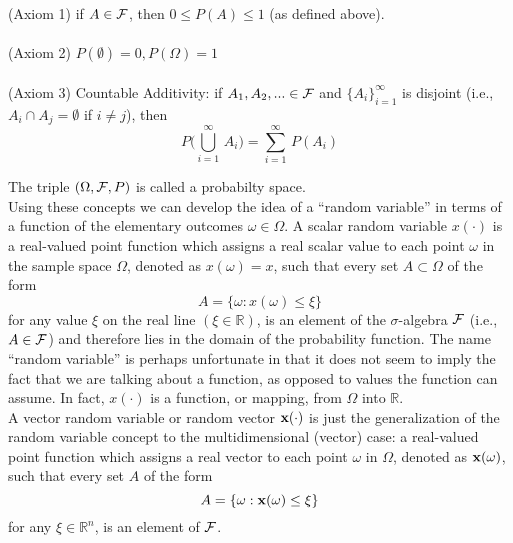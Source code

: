 (Axiom 1) if $A \in {\cal F}$, then $0\le P(A) \le 1$ (as defined above).\\ \\
(Axiom 2) $P(\emptyset) = 0, P(\Omega) = 1$\\ \\
(Axiom 3) {\elevenit Countable Additivity:}\/ if $A_1, A_2, ... \in {\cal F}$ and $\{A_i\}_{i=1}^{\infty}$ is disjoint (i.e., $A_i\cap A_j = \emptyset$ if $i \ne j$), then\\
$$ P\Big( \bigcup\limits_{i=1}^{\infty}\, A_i \Big) = \sum_{i=1}^{\infty} \, P(A_i)$$

The triple $(\Omega, {\cal F}, P)$ is called a probabilty space. \\

Using these concepts we can develop the idea of a ``random variable'' in terms of a function of the elementary outcomes $\omega \in \Omega$. A scalar random variable $x(\cdot)$ is a real-valued point function which assigns a real scalar value to each point $\omega$ in the sample space $\Omega$, denoted as $x(\omega) = x$, such that every set $A \subset \Omega$ of the form $$ A = \{ \omega: x(\omega) \le \xi\}$$ for any value $\xi$ on the real line $(\xi \in \mathbb{R})$, is an element of the $\sigma$-algebra $\cal F$ (i.e., $A \in {\cal F}$) and therefore lies in the domain of the probability function.
 The name ``random variable'' is perhaps unfortunate in that it does not seem to imply the fact that we are talking about a function, as opposed to values the function can assume. In fact, $x(\cdot)$ is a function, or mapping, from $\Omega$ into $\mathbb{R}$.\\

A vector random variable or random vector ${\bf x}(\cdot)$ is just the generalization of the random variable concept to the multidimensional (vector) case: a real-valued point function which assigns a real vector to each point $\omega$ in $\Omega$, denoted as ${\bf x}(\omega)$, such that every set $A$ of the form $$A = \{\omega: {\bf x}(\omega) \le \xi\}$$ for any $\xi \in \mathbb{R}^n$, is an element of $\cal F$.

